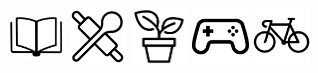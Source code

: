 \documentclass{tccv}
\begin{document}
\includegraphics[width=1.5cm, height=1.5cm]{book-bw}
\includegraphics[width=1.5cm, height=1.5cm]{cooking-bw}
\includegraphics[width=1.5cm, height=1.5cm]{plant-bw}
\includegraphics[width=1.5cm, height=1.5cm]{controller-bw}
\includegraphics[width=1.5cm, height=1.5cm]{bicycle-bw}
\end{document}
